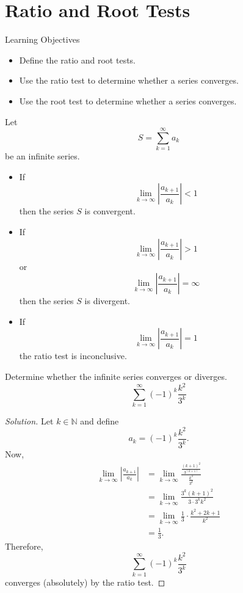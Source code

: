 \documentclass[compacto,10pt,comentarios]{aleph-notas}
\begin{document}
\encabezado
\section*{Ratio and Root Tests}
\begin{mdframed}
    \center Learning Objectives \\
    \begin{itemize}
        \item Define the ratio and root tests.
        \item Use the ratio test to determine whether a series converges.
        \item Use the root test to determine whether a series converges.
    \end{itemize}
\end{mdframed}

\begin{defi}
    Let
    $$
        S = \sum_{k=1}^{\infty} a_k
    $$
    be an infinite series.
    \begin{itemize}
        \item If
            $$
                \lim_{k \to \infty} \left| \frac{a_{k + 1}}{a_k} \right| < 1
            $$
            then the series $S$ is convergent.
        \item If
            $$
                \lim_{k \to \infty} \left| \frac{a_{k+1}}{a_k} \right| > 1
            $$
            or
            $$
                \lim_{k \to \infty} \left| \frac{a_{k+1}}{a_k} \right| = \infty
            $$
            then the series $S$ is divergent.
        \item If
            $$
                \lim_{k \to \infty} \left| \frac{a_{k+1}}{a_k}\right| = 1
            $$
            the ratio test is inconclusive. 
    \end{itemize}
\end{defi}

\begin{ejer}
    Determine whether the infinite series converges or diverges.
    $$
        \sum_{k=1}^{\infty} (-1)^{k} \frac{k^2}{3^k}
    $$
\end{ejer}
\begin{proof}[Solution]
    Let $k \in \mathbb{N}$ and define
    $$
        a_k = (-1)^{k} \frac{k^2}{3^{k}}.
    $$
    Now,
    \begin{align*}
        \lim_{k \to \infty} \left| \frac{a_{k+1}}{a_k} \right| 
        & = \lim_{k \to \infty} \frac{\frac{(k + 1)^2}{3^{(k + 1)}}}{\frac{k^2}{3^{k}}} \\
        & = \lim_{k \to \infty} \frac{3^{k} (k+1)^2}{3\cdot 3^{k} k^2} \\
        & = \lim_{k \to \infty} \frac{1}{3} \cdot \frac{k^2+2k+1}{k^2} \\
        & = \frac{1}{3}.
    \end{align*}
    Therefore,
    $$
        \sum_{k=1}^{\infty} (-1)^{k} \frac{k^2}{3^k}
    $$
    converges (absolutely) by the ratio test.
\end{proof}
\end{document}
